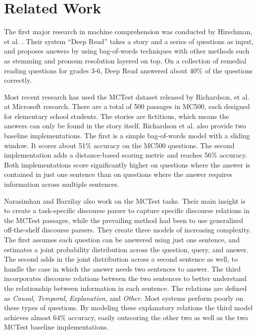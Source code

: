 \documentclass[pageno]{final_paper}
\begin{document}
\section{Related Work}
\label{Related Work}

The first major research in machine comprehension was conducted by Hirschman, et
al. \cite{Hirschman1999}. Their system ``Deep Read'' takes a story and a series
of questions as input, and proposes answers by using bag-of-words techniques
with other methods such as stemming and pronoun resolution layered on top. On a
collection of remedial reading questions for grades 3-6, Deep Read answered
about 40\% of the questions correctly.

Most recent research has used the MCTest dataset \cite{Richardson2013} released
by Richardson, et al. at Microsoft research. There are a total of 500 passages
in MC500, each designed for elementary school students. The stories are
fictitious, which means the answers can only be found in the story itself.
Richardson et al. also provide two baseline implementations. The first is a
simple bag-of-words model with a sliding window. It scores about 51\% accuracy
on the MC500 questions. The second implementation adds a distance-based scoring
metric and reaches 56\% accuracy. Both implementations score significantly
higher on questions where the answer is contained in just one sentence than on
questions where the answer requires information across multiple sentences.

Narasimhan and Barzilay \cite{Narasimhan2015} also work on the MCTest tasks.
Their main insight is to create a task-specific discourse parser to capture
specific discourse relations in the MCTest passages, while the prevailing method
had been to use generalized off-the-shelf discourse parsers. They create three
models of increasing complexity. The first assumes each question can be answered
using just one sentence, and estimates a joint probability distribution across
the question, query, and answer. The second adds in the joint distribution
across a second sentence as well, to handle the case in which the answer needs
two sentences to answer. The third incorporates discourse relations between the
two sentences to better understand the relationship between information in each
sentence. The relations are defined as \textit{Causal}, \textit{Temporal},
\textit{Explanation}, and \textit{Other}. Most systems perform poorly on these
types of questions. By  modeling these explanatory relations the third model
achieves almost 64\% accuracy, easily outscoring the other two as well as the
two MCTest baseline implementations.
\end{document}
